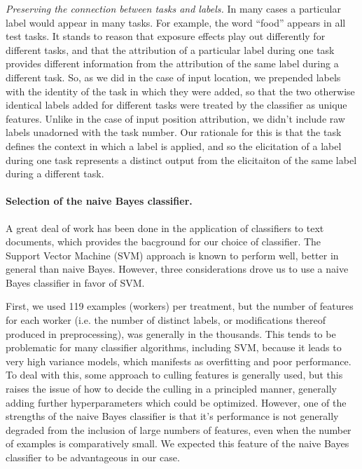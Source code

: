 \documentclass[12pt]{article}
\begin{document}
	\textit{Preserving the connection between tasks and labels.}  In many
	cases a particular label would appear in many tasks.  For example, the
	word ``food'' appears in all test tasks.  It stands to reason that
	exposure effects play out differently for different tasks, and that
	the attribution of a particular label during one task provides different
	information from the attribution of the same label during a different 
	task.  So, as we did in the case of input location, we prepended labels
	with the identity of the task in which they were added, so that the 
	two otherwise identical labels added for different tasks were treated
	by the classifier as unique features.  Unlike in the case of input 
	position attribution, we didn't include raw labels unadorned with 
	the task number.  Our rationale for this is that the task defines the 
	context in which a label is applied, and so the elicitation of a label 
	during one task represents a distinct output from the elicitaiton of the 
	same label during a different task.  

\paragraph{Selection of the naive Bayes classifier.}
A great deal of work has been done in the application of classifiers to
text documents, which provides the bacground for our choice of classifier.
The Support Vector Machine (SVM) approach is known to perform well, better in 
general than naive Bayes.  However, three considerations drove us to use
a naive Bayes classifier in favor of SVM.

First, we used 119 examples (workers) per treatment, but the number of 
features
for each worker (i.e. the number of distinct labels, or modifications 
thereof produced in preprocessing), was generally in the thousands.  
This tends to
be problematic for many classifier algorithms, including SVM, because it
leads to very high variance models, which manifests as overfitting and poor
performance.  To deal with this, some approach to culling features is 
generally used, but this raises the issue of how to decide the culling in 
a principled manner, generally adding further hyperparameters which could
be optimized.  However, one of the strengths of the naive Bayes classifier
is that it's performance is not generally degraded from the inclusion of 
large numbers of features, even when the number of examples is comparatively
small.  We expected this feature of the naive Bayes classifier to be 
advantageous in our case.
\end{document}
